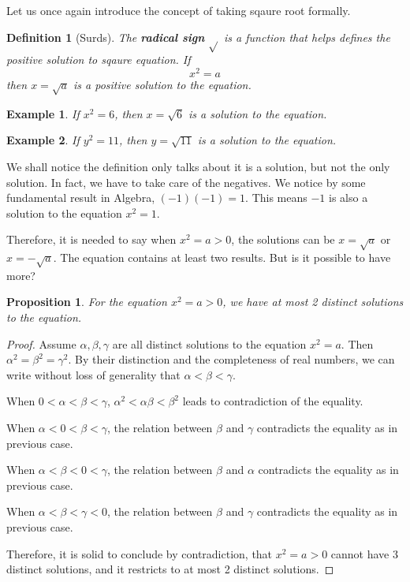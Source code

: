 \documentclass[12pt]{article}
\newtheorem{definition}{Definition}[section]
\newtheorem*{proposition}{Proposition}
\newtheorem*{example}{Example}
\begin{document}
    Let us once again introduce the concept of taking sqaure root formally.

    \begin{definition}[Surds]
        The \textbf{radical sign} \(\sqrt{}\) is a function that helps defines the positive solution to sqaure equation. If \[x^2=a\] then \(x=\sqrt{a}\) is a positive solution to the equation.
    \end{definition}

    \begin{example}
        If $x^2=6$, then $x=\sqrt{6}$ is a solution to the equation.
    \end{example}

    \begin{example}
        If $y^2=11$, then $y=\sqrt{11}$ is a solution to the equation.
    \end{example}

    We shall notice the definition only talks about it is a solution, but not the only solution. In fact, we have to take care of the negatives. We notice by some fundamental result in Algebra, $(-1)(-1)=1$. This means $-1$ is also a solution to the equation $x^2=1$.

    Therefore, it is needed to say when $x^2=a>0$, the solutions can be $x=\sqrt{a}$ or $x=-\sqrt{a}$. The equation contains at least two results. But is it possible to have more?

    \begin{proposition}
        For the equation $x^2=a>0$, we have at most 2 distinct solutions to the equation. 
    \end{proposition}

    \begin{proof}
        Assume $\alpha,\beta,\gamma$ are all distinct solutions to the equation $x^2=a$. Then $\alpha^2=\beta^2=\gamma^2$. By their distinction and the completeness of real numbers, we can write without loss of generality that $\alpha<\beta<\gamma$.

        When $0<\alpha<\beta<\gamma$, $\alpha^2<\alpha\beta<\beta^2$ leads to contradiction of the equality.

        When $\alpha<0<\beta<\gamma$, the relation between $\beta$ and $\gamma$ contradicts the equality as in previous case.

        When $\alpha<\beta<0<\gamma$, the relation between $\beta$ and $\alpha$ contradicts the equality as in previous case.

        When $\alpha<\beta<\gamma<0$, the relation between $\beta$ and $\gamma$ contradicts the equality as in previous case.

        Therefore, it is solid to conclude by contradiction, that $x^2=a>0$ cannot have 3 distinct solutions, and it restricts to at most 2 distinct solutions.
    \end{proof}
\end{document}

